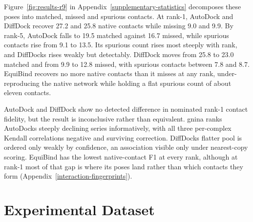 Figure~\ref{fig:results-r9} in Appendix~\ref{supplementary-statistics} decomposes these poses into matched, missed and spurious contacts. At rank-1, AutoDock and DiffDock recover 27.2 and 25.8 native contacts while missing 9.0 and 9.9. By rank-5, AutoDock falls to 19.5 matched against 16.7 missed, while spurious contacts rise from 9.1 to 13.5. Its spurious count rises most steeply with rank, and DiffDock\textquotesingle s rises weakly but detectably. DiffDock moves from 25.8 to 23.0 matched and from 9.9 to 12.8 missed, with spurious contacts between 7.8 and 8.7. EquiBind recovers no more native contacts than it misses at any rank, under-reproducing the native network while holding a flat spurious count of about eleven contacts.

AutoDock and DiffDock show no detected difference in nominated rank-1 contact fidelity, but the result is inconclusive rather than equivalent. gnina ranks AutoDock\textquotesingle s steeply declining series informatively, with all three per-complex Kendall correlations negative and surviving correction. DiffDock\textquotesingle s flatter pool is ordered only weakly by confidence, an association visible only under nearest-copy scoring. EquiBind has the lowest native-contact F1 at every rank, although at rank-1 most of that gap is where its poses land rather than which contacts they form (Appendix~\ref{interaction-fingerprints}).

\protect\hypertarget{_Toc235735934}{}{}

\hypertarget{experimental-dataset-1}{%
\section{Experimental Dataset}\label{experimental-dataset-1}}

